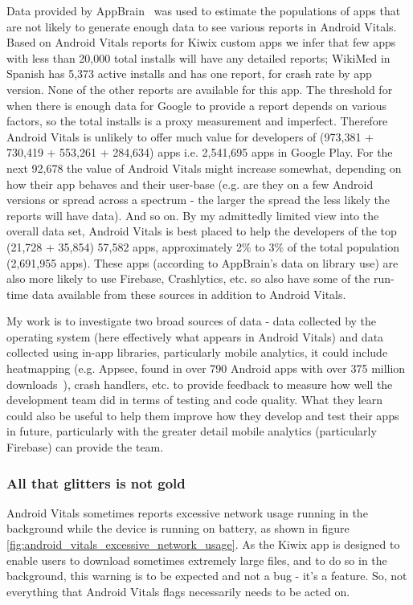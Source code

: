 Data provided by AppBrain~\cite{appbrain_download_statistics_june_2019} was used to estimate the populations of apps that are not likely to generate enough data to see various reports in Android Vitals.
% 
Based on Android Vitals reports for Kiwix custom apps we infer that few apps with less than 20,000 total installs will have any detailed reports; WikiMed in Spanish has 5,373 active installs and has one report, for crash rate by app version. None of the other reports are available for this app. The threshold for when there is enough data for Google to provide a report depends on various factors, so the total installs is a proxy measurement and imperfect. Therefore Android Vitals is unlikely to offer much value for developers of (973,381 + 730,419 + 553,261 + 284,634) apps i.e. 2,541,695 apps in Google Play. For the next 92,678 the value of Android Vitals might increase somewhat, depending on how their app behaves and their user-base (e.g. are they on a few Android versions or spread across a spectrum - the larger the spread the less likely the reports will have data). And so on. By my admittedly limited view into the overall data set, Android Vitals is best placed to help the developers of the top (21,728 + 35,854) 57,582 apps, approximately 2\% to 3\% of the total population (2,691,955 apps). These apps (according to AppBrain's data on library use) are also more likely to use Firebase, Crashlytics, etc. so also have some of the run-time data available from these sources in addition to Android Vitals.

My work is to investigate two broad sources of data - data collected by the operating system (here effectively what appears in Android Vitals) and data collected using in-app libraries, particularly mobile analytics, it could include heatmapping (e.g. Appsee, found in over 790 Android apps with over 375 million downloads~\cite{appbrain_appsee}), crash handlers, etc. to provide feedback to measure how well the development team did in terms of testing and code quality. What they learn could also be useful to help them improve how they develop and test their apps in future, particularly with the greater detail mobile analytics (particularly Firebase) can provide the team.

\subsubsection{All that glitters is not gold}
Android Vitals sometimes reports excessive network usage running in the background while the device is running on battery, as shown in figure \ref{fig:android_vitals_excessive_network_usage}. As the Kiwix app is designed to enable users to download sometimes extremely large files, and to do so in the background, this warning is to be expected and not a bug - it's a feature. So, not everything that Android Vitals flags necessarily needs to be acted on. %

